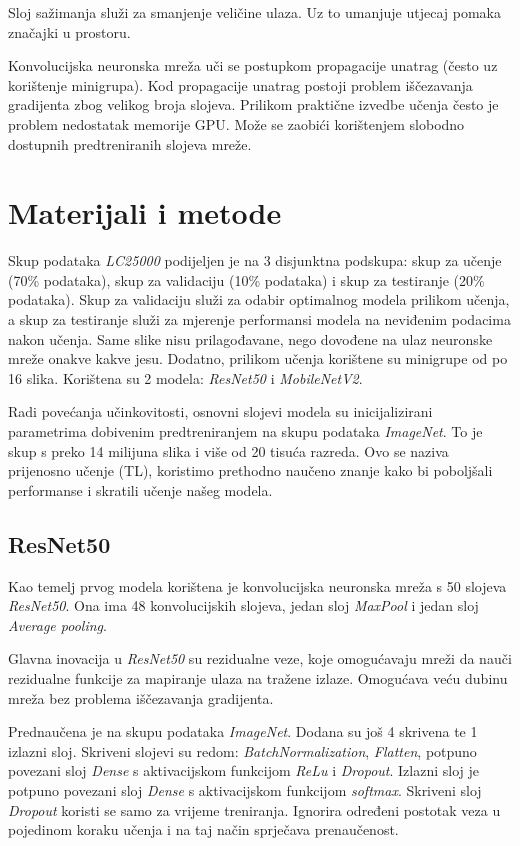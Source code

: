 \documentclass[conference, utf8]{IEEEtran}
\begin{document}
	Sloj sažimanja služi za smanjenje veličine ulaza. Uz to umanjuje utjecaj pomaka značajki u prostoru.
	
	Konvolucijska neuronska mreža uči se postupkom propagacije unatrag (često uz korištenje minigrupa). Kod propagacije unatrag postoji problem iščezavanja gradijenta zbog velikog broja slojeva. Prilikom praktične izvedbe učenja često je problem nedostatak memorije GPU. Može se zaobići korištenjem slobodno dostupnih predtreniranih slojeva mreže.
	
	\section{Materijali i metode}
	Skup podataka \textit{LC25000} podijeljen je na 3 disjunktna podskupa: skup za učenje (70\% podataka), skup za validaciju (10\% podataka) i skup za testiranje (20\% podataka). Skup za validaciju služi za odabir optimalnog modela prilikom učenja, a skup za testiranje služi za mjerenje performansi modela na neviđenim podacima nakon učenja. Same slike nisu prilagođavane, nego dovođene na ulaz neuronske mreže onakve kakve jesu. Dodatno, prilikom učenja korištene su minigrupe od po 16 slika. Korištena su 2 modela: \textit{ResNet50} i \textit{MobileNetV2}. 
	
	Radi povećanja učinkovitosti, osnovni slojevi modela su inicijalizirani parametrima dobivenim predtreniranjem na skupu podataka \textit{ImageNet}. To je skup s preko 14 milijuna slika i više od 20 tisuća razreda. Ovo se naziva prijenosno učenje (TL), koristimo prethodno naučeno znanje kako bi poboljšali performanse i skratili učenje našeg modela.
	
	\subsection{ResNet50}
	Kao temelj prvog modela korištena je konvolucijska neuronska mreža s 50 slojeva \textit{ResNet50}. Ona ima 48 konvolucijskih slojeva, jedan sloj \textit{MaxPool} i jedan sloj \textit{Average pooling}. 
	
	Glavna inovacija u \textit{ResNet50} su rezidualne veze, koje omogućavaju mreži da nauči rezidualne funkcije za mapiranje ulaza na tražene izlaze. Omogućava veću dubinu mreža bez problema iščezavanja gradijenta. 
	
	Prednaučena je na skupu podataka \textit{ImageNet}. Dodana su još 4 skrivena te 1 izlazni sloj. Skriveni slojevi su redom: \textit{BatchNormalization}, \textit{Flatten}, potpuno povezani sloj \textit{Dense} s aktivacijskom funkcijom \textit{ReLu} i \textit{Dropout}. Izlazni sloj je potpuno povezani sloj \textit{Dense} s aktivacijskom funkcijom \textit{softmax}. Skriveni sloj \textit{Dropout} koristi se samo za vrijeme treniranja. Ignorira određeni postotak veza u pojedinom koraku učenja i na taj način sprječava prenaučenost.
	
\end{document}
